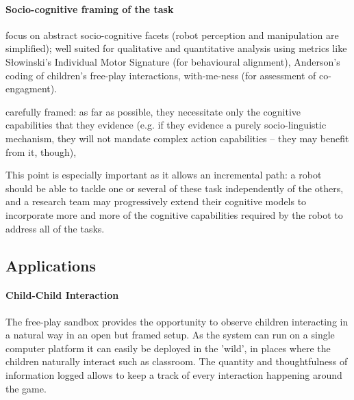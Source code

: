 \documentclass[sigconf]{acmart}
\begin{document}
%

\paragraph{Socio-cognitive framing of the task}

focus on abstract socio-cognitive facets (robot
perception and manipulation are simplified); well suited for qualitative and
quantitative analysis using metrics like Słowinski’s Individual Motor Signature
(for behavioural alignment), Anderson's~\cite{anderson2004social} coding of children’s free-play
interactions, with-me-ness (for assessment of co-engagment).

carefully framed: as far as possible, they necessitate only the cognitive
capabilities that they evidence (e.g. if they evidence a purely socio-linguistic
mechanism, they will not mandate complex action capabilities – they may benefit
from it, though),

This point is especially important as it allows an incremental path: a robot
should be able to tackle one or several of these task independently of the
others, and a research team may progressively extend their cognitive models to
incorporate more and more of the cognitive capabilities required by the robot to
address all of the tasks.

\subsection{Applications}
\label{sec:applications}

\paragraph{Child-Child Interaction}

The free-play sandbox provides the opportunity to observe children interacting in a natural way in an open but framed setup. As the system can run on a single computer platform it can easily be deployed in the 'wild', in places where the children naturally interact such as classroom. The quantity and thoughtfulness of information logged allows to keep a track of every interaction happening around the game. 
\end{document}
